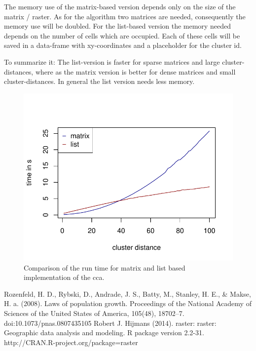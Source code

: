 \documentclass[10pt,a4paper]{article}
\begin{document}
The memory use of the matrix-based version depends only on the size of the matrix / raster. As for the algorithm two matrices are needed, consequently the memory use will be doubled. For the list-based version the memory needed depends on the number of cells which are occupied. Each of these cells will be saved in a data-frame with xy-coordinates and a placeholder for the cluster id.

To summarize it: The list-version is faster for sparse matrices and large cluster-distances, where as the matrix version is better for dense matrices and small cluster-distances. In general the list version needs less memory.



\begin{figure}
\centering
\includegraphics{compare.pdf}
\caption{Comparison of the run time for matrix and list based implementation of the cca.}
\label{fig:compare}
\end{figure}

\newpage
\begin{thebibliography}{9}
Rozenfeld, H. D., Rybski, D., Andrade, J. S., Batty, M., Stanley, H. E., \& Makse, H. a. (2008). Laws of population growth. Proceedings of the National Academy of Sciences of the United States of America, 105(48), 18702–7. doi:10.1073/pnas.0807435105
Robert J. Hijmans (2014). raster: raster: Geographic data analysis and modeling. R package version 2.2-31.
  http://CRAN.R-project.org/package=raster
\end{thebibliography}
\end{document}
